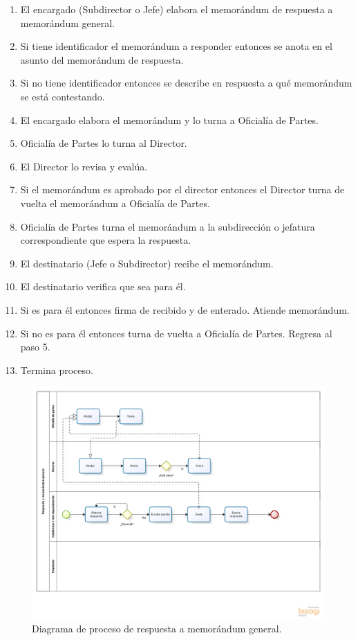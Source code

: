 	\begin{enumerate}
		\item El encargado (Subdirector o Jefe) elabora el memorándum de respuesta a memorándum general.
		\item Si tiene identificador el memorándum a responder entonces se anota en el asunto del memorándum de respuesta.
		\item Si no tiene identificador entonces se describe en respuesta a qué memorándum se está contestando.
		\item El encargado elabora el memorándum y lo turna a Oficialía de Partes.
		\item Oficialía de Partes lo turna al Director.
		\item El Director lo revisa y evalúa.
		\item Si el memorándum es aprobado por el director entonces el Director turna de vuelta el memorándum a Oficialía de Partes.
		\item Oficialía de Partes turna el memorándum a la subdirección o jefatura correspondiente que espera la respuesta.
		\item El destinatario (Jefe o Subdirector) recibe el memorándum.
		\item El destinatario verifica que sea para él.
		\item Si es para él entonces firma de recibido y de enterado. Atiende memorándum.
		\item Si no es para él entonces turna de vuelta a Oficialía de Partes. Regresa al paso 5.
		\item Termina proceso.
	\end{enumerate}
	
	\begin{figure}[htbp!]
		\centering
			\includegraphics[width=1.2\textwidth]{images/antecedentes/rememogeneral}
		\caption{Diagrama de proceso de respuesta a memorándum general.}
		\label{fig:MemoReGeneral}
	\end{figure}
	
